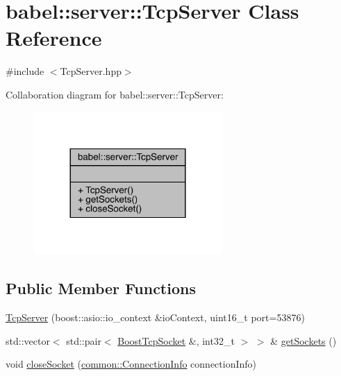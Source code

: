 \hypertarget{classbabel_1_1server_1_1_tcp_server}{}\section{babel\+:\+:server\+:\+:Tcp\+Server Class Reference}
\label{classbabel_1_1server_1_1_tcp_server}


{\ttfamily \#include $<$Tcp\+Server.\+hpp$>$}



Collaboration diagram for babel\+:\+:server\+:\+:Tcp\+Server\+:\nopagebreak
\begin{figure}[H]
\begin{center}
\leavevmode
\includegraphics[width=204pt]{classbabel_1_1server_1_1_tcp_server__coll__graph}
\end{center}
\end{figure}
\subsection*{Public Member Functions}
\begin{DoxyCompactItemize}
\item 
\mbox{\hyperlink{classbabel_1_1server_1_1_tcp_server_a34d6d6ce02cedfe4dd3c39f89870d9f2}{Tcp\+Server}} (boost\+::asio\+::io\+\_\+context \&io\+Context, uint16\+\_\+t port=53876)
\item 
std\+::vector$<$ std\+::pair$<$ \mbox{\hyperlink{classbabel_1_1server_1_1_boost_tcp_socket}{Boost\+Tcp\+Socket}} \&, int32\+\_\+t $>$ $>$ \& \mbox{\hyperlink{classbabel_1_1server_1_1_tcp_server_a0229ce4a4e3288b644915c8a98820eb7}{get\+Sockets}} ()
\item 
void \mbox{\hyperlink{classbabel_1_1server_1_1_tcp_server_afca52d128850b14d4f6a69bd2d9fe877}{close\+Socket}} (\mbox{\hyperlink{classbabel_1_1common_1_1_connection_info}{common\+::\+Connection\+Info}} connection\+Info)
\end{DoxyCompactItemize}


